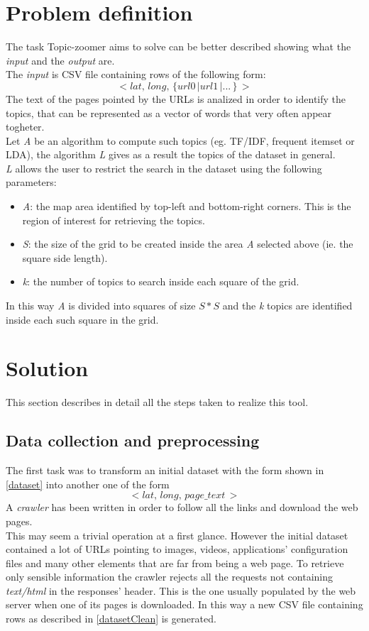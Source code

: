 \documentclass{sig-alternate-05-2015}
\begin{document}
\section{Problem definition}
The task Topic-zoomer aims to solve can be better described showing what the \emph{input} and the \emph{output} are.\\
The \emph{input} is CSV file containing rows of the following form:
\begin{equation}\label{dataset}
    <lat,\,long,\,\{url0\,|url1\,|...\,\}\,>
\end{equation}
The text of the pages pointed by the URLs is analized in order to identify the topics, that can be represented as a vector of words that very often appear togheter.\\
Let \emph{A} be an algorithm to compute such topics (eg. TF/IDF, frequent itemset or LDA), the algorithm \emph{L} gives as a result the topics of the dataset in general.\\
\emph{L} allows the user to restrict the search in the dataset using the following parameters:
\begin{itemize}
    \item \emph{A}: the map area identified by top-left and bottom-right corners. This is the region of interest for retrieving the topics. 
    \item \emph{S}: the size of the grid to be created inside the area \emph{A} selected above (ie. the square side length).
    \item \emph{k}: the number of topics to search inside each square of the grid.
\end{itemize}
In this way \emph{A} is divided into squares of size $S*S$ and the \emph{k} topics are identified inside each such square in the grid.


\section{Solution}
This section describes in detail all the steps taken to realize this tool.
\subsection{Data collection and preprocessing}
The first task was to transform an initial dataset with the form shown in \ref{dataset} into another one of the form
\begin{equation}\label{datasetClean}
    <lat,\,long,\,page\_text\,>
\end{equation}
A \emph{crawler} has been written in order to follow all the links and download the web pages.\\
This may seem a trivial operation at a first glance. However the initial dataset contained a lot of URLs pointing to images, videos, applications' configuration files and many other elements that are far from being a web page. To retrieve only sensible information the crawler rejects all the requests not containing \emph{text/html} in the responses' header. This is the one usually populated by the web server when one of its pages is downloaded. In this way a new CSV file containing rows as described in \ref{datasetClean} is generated.
\end{document}
